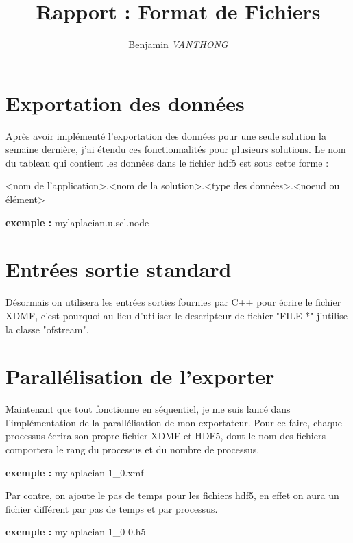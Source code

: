 \documentclass[10pt]{article}
\title {Rapport : Format de Fichiers}
\author {Benjamin \emph{VANTHONG}}
\begin{document}
\maketitle 
\section {Exportation des données}
Après avoir implémenté l'exportation des données pour une seule solution la semaine dernière, j'ai étendu ces fonctionnalités pour plusieurs solutions. Le nom du tableau qui contient les données dans le fichier hdf5 est sous cette forme : \newline

<nom de l'application>.<nom de la solution>.<type des données>.<noeud ou élément>\newline

\textbf{exemple : }mylaplacian.u.scl.node
\section {Entrées sortie standard}
Désormais on utilisera les entrées sorties fournies par C++ pour écrire le fichier XDMF, c'est pourquoi au lieu d'utiliser le descripteur de fichier "FILE *" j'utilise la classe "ofstream".

\section {Parallélisation de l'exporter}
Maintenant que tout fonctionne en séquentiel, je me suis lancé dans l'implémentation de la parallélisation de mon exportateur. Pour ce faire, chaque processus écrira son propre fichier XDMF et HDF5, dont le nom des fichiers comportera le rang du processus et du nombre de processus. \newline

\textbf{exemple : } mylaplacian-1\_0.xmf\newline

Par contre, on ajoute le pas de temps pour les fichiers hdf5, en effet on aura un fichier différent par pas de temps et par processus.\newline

\textbf{exemple : } mylaplacian-1\_0-0.h5\newline
\end{document}
